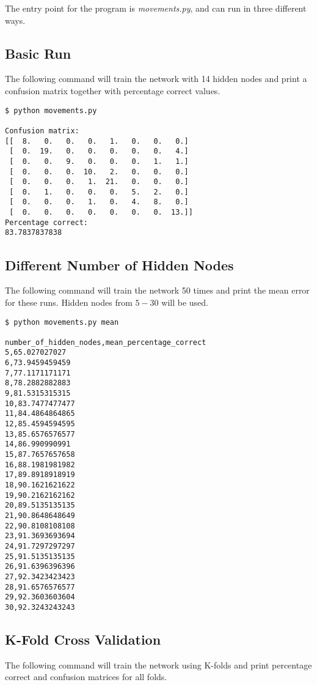 \documentclass{article}
\begin{document}
The entry point for the program is \textit{movements.py}, and can run in three different ways.

\subsection*{Basic Run}

The following command will train the network with 14 hidden nodes and print a confusion matrix together with percentage correct values.

\begin{verbatim}
$ python movements.py

Confusion matrix:
[[  8.   0.   0.   0.   1.   0.   0.   0.]
 [  0.  19.   0.   0.   0.   0.   0.   4.]
 [  0.   0.   9.   0.   0.   0.   1.   1.]
 [  0.   0.   0.  10.   2.   0.   0.   0.]
 [  0.   0.   0.   1.  21.   0.   0.   0.]
 [  0.   1.   0.   0.   0.   5.   2.   0.]
 [  0.   0.   0.   1.   0.   4.   8.   0.]
 [  0.   0.   0.   0.   0.   0.   0.  13.]]
Percentage correct:
83.7837837838
\end{verbatim}

\subsection*{Different Number of Hidden Nodes}

The following command will train the network 50 times and print the mean error for these runs. Hidden nodes from $5 - 30$ will be used.

\begin{verbatim}
$ python movements.py mean

number_of_hidden_nodes,mean_percentage_correct
5,65.027027027
6,73.9459459459
7,77.1171171171
8,78.2882882883
9,81.5315315315
10,83.7477477477
11,84.4864864865
12,85.4594594595
13,85.6576576577
14,86.990990991
15,87.7657657658
16,88.1981981982
17,89.8918918919
18,90.1621621622
19,90.2162162162
20,89.5135135135
21,90.8648648649
22,90.8108108108
23,91.3693693694
24,91.7297297297
25,91.5135135135
26,91.6396396396
27,92.3423423423
28,91.6576576577
29,92.3603603604
30,92.3243243243
\end{verbatim}

\subsection*{K-Fold Cross Validation}

The following command will train the network using K-folds and print percentage correct and confusion matrices for all folds.
\end{document}
